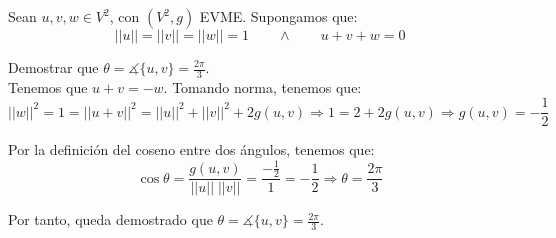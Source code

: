 \begin{ejercicio}
    Sean $u,v,w\in V^2$, con $(V^2,g)$ EVME. Supongamos que:
    \begin{equation*}
        ||u||=||v||=||w||=1
        \qquad \land \qquad
        u+v+w=0
    \end{equation*}

    Demostrar que $\theta = \measuredangle \{u,v\}=\frac{2\pi}{3}$.\\


    Tenemos que $u+v=-w$. Tomando norma, tenemos que:
    \begin{equation*}
        ||w||^2=1 = ||u+v||^2 = ||u||^2 + ||v||^2 + 2g(u,v) \Longrightarrow 1=2+2g(u,v) \Longrightarrow g(u,v)=-\frac{1}{2}
    \end{equation*}

    Por la definición del coseno entre dos ángulos, tenemos que:
    \begin{equation*}
        \cos \theta = \frac{g(u,v)}{||u||\;||v||} = \frac{-\frac{1}{2}}{1} = -\frac{1}{2} \Longrightarrow \theta = \frac{2\pi}{3}
    \end{equation*}

    Por tanto, queda demostrado que $\theta = \measuredangle \{u,v\}=\frac{2\pi}{3}$.
\end{ejercicio}


